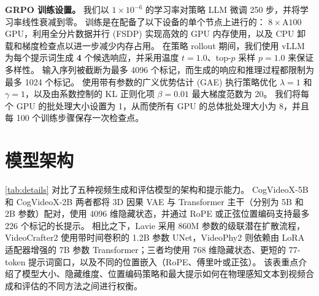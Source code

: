 \textbf{GRPO 训练设置。}
我们以 $1\times10^{-6}$ 的学习率对策略 LLM 微调 250 步，并将学习率线性衰减到零。
训练是在配备了以下设备的单个节点上进行的： $8{\times}\mathrm{A}100$ GPU，利用全分片数据并行 (FSDP) 实现高效的 GPU 内存使用，以及 CPU 卸载和梯度检查点以进一步减少内存占用。
在策略 rollout 期间，我们使用 vLLM 为每个提示词生成 \textbf{4} 个候选响应，并采用温度 $t=1.0$、top-$p$ 采样 $p=1.0$ 来保证多样性。
输入序列被截断为最多 4096 个标记，而生成的响应和推理过程都限制为最多 1024 个标记。
使用带有参数的广义优势估计 (GAE) 执行策略优化 $\lambda=1$ 和 $\gamma=1$，以及由系数控制的 KL 正则化项 $\beta=0.01$ 最大梯度范数为 20。
我们将每个 GPU 的批处理大小设置为 1，从而使所有 GPU 的总体批处理大小为 8，并且每 100 个训练步骤保存一次检查点。



\section{模型架构}
\cref{tab:details} 对比了五种视频生成和评估模型的架构和提示能力。
CogVideoX-5B 和 CogVideoX-2B \cite{wang2024cogvideodex} 两者都将 3D 因果 VAE 与 Transformer 主干（分别为 5B 和 2B 参数）配对，使用 4096 维隐藏状态，并通过 RoPE 或正弦位置编码支持最多 226 个标记的长提示。
相比之下，Lavie \cite{wang2023lavie} 采用 860M 参数的级联潜在扩散流程，VideoCrafter2 \cite{chen2024videocrafter2} 使用带时间卷积的 1.2B 参数 UNet，VideoPhy2 \cite{bansal2025videophy2} 则依赖由 LoRA 适配器增强的 7B 参数 Transformer；三者均使用 768 维隐藏状态、更短的 77-token 提示词窗口，以及不同的位置嵌入（RoPE、傅里叶或正弦）。
该表重点介绍了模型大小、隐藏维度、位置编码策略和最大提示如何在物理感知文本到视频合成和评估的不同方法之间进行权衡。

\begin{table}[h]
\centering
\caption{四篇论文中报告了模型详细信息。}
\label{tab:details}
{}
\end{table}
